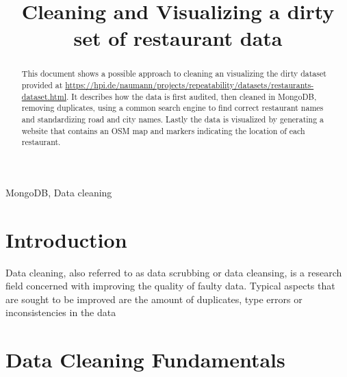 \documentclass[conference]{IEEEtran}
\begin{document}
\title{Cleaning and Visualizing a dirty set of restaurant data}


\author{
}

\maketitle

\begin{abstract}
This document shows a possible approach to cleaning an visualizing the dirty dataset provided at \url{https://hpi.de/naumann/projects/repeatability/datasets/restaurants-dataset.html}. It describes how the data is first audited, then cleaned in MongoDB, removing duplicates, using a common search engine to find correct restaurant names and standardizing road and city names. Lastly the data is visualized by generating a website that contains an OSM map and markers indicating the location of each restaurant.
\end{abstract}

\begin{IEEEkeywords}
MongoDB, Data cleaning
\end{IEEEkeywords}

\section{Introduction}
Data cleaning, also referred to as data scrubbing or data cleansing, is a research field concerned with improving the quality of faulty data. Typical aspects that are sought to be improved are the amount of duplicates, type errors or inconsistencies in the data\cite{Bilenko.2003}


\section{Data Cleaning Fundamentals}

\printbibliography
\end{document}
